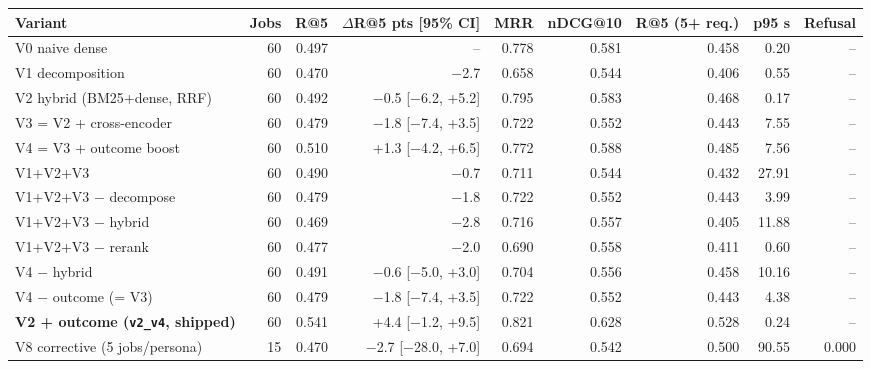 \begin{tabular}{lrrrrrrrr}
\toprule
Variant & Jobs & R@5 & $\Delta$R@5 pts [95\% CI] & MRR & nDCG@10 & R@5 (5+ req.) & p95 s & Refusal \\
\midrule
V0 naive dense & 60 & 0.497 & -- & 0.778 & 0.581 & 0.458 & 0.20 & -- \\
V1 decomposition & 60 & 0.470 & $-$2.7 & 0.658 & 0.544 & 0.406 & 0.55 & -- \\
V2 hybrid (BM25+dense, RRF) & 60 & 0.492 & $-$0.5 [$-$6.2, +5.2] & 0.795 & 0.583 & 0.468 & 0.17 & -- \\
V3 = V2 + cross-encoder & 60 & 0.479 & $-$1.8 [$-$7.4, +3.5] & 0.722 & 0.552 & 0.443 & 7.55 & -- \\
V4 = V3 + outcome boost & 60 & 0.510 & +1.3 [$-$4.2, +6.5] & 0.772 & 0.588 & 0.485 & 7.56 & -- \\
V1+V2+V3 & 60 & 0.490 & $-$0.7 & 0.711 & 0.544 & 0.432 & 27.91 & -- \\
V1+V2+V3 $-$ decompose & 60 & 0.479 & $-$1.8 & 0.722 & 0.552 & 0.443 & 3.99 & -- \\
V1+V2+V3 $-$ hybrid & 60 & 0.469 & $-$2.8 & 0.716 & 0.557 & 0.405 & 11.88 & -- \\
V1+V2+V3 $-$ rerank & 60 & 0.477 & $-$2.0 & 0.690 & 0.558 & 0.411 & 0.60 & -- \\
V4 $-$ hybrid & 60 & 0.491 & $-$0.6 [$-$5.0, +3.0] & 0.704 & 0.556 & 0.458 & 10.16 & -- \\
V4 $-$ outcome (= V3) & 60 & 0.479 & $-$1.8 [$-$7.4, +3.5] & 0.722 & 0.552 & 0.443 & 4.38 & -- \\
\textbf{V2 + outcome (\texttt{v2\_v4}, shipped)} & 60 & 0.541 & +4.4 [$-$1.2, +9.5] & 0.821 & 0.628 & 0.528 & 0.24 & -- \\
V8 corrective (5 jobs/persona) & 15 & 0.470 & $-$2.7 [$-$28.0, +7.0] & 0.694 & 0.542 & 0.500 & 90.55 & 0.000 \\
\bottomrule
\end{tabular}
